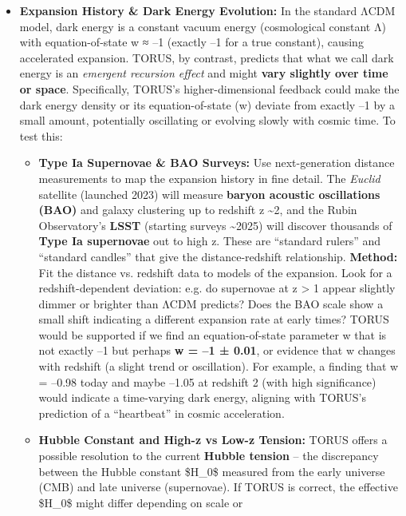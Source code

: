 \documentclass[]{article}
\begin{document}
\begin{itemize}
\item
  \textbf{Expansion History \& Dark Energy Evolution:} In the standard
  ΛCDM model, dark energy is a constant vacuum energy (cosmological
  constant Λ) with equation-of-state w ≈ --1 (exactly --1 for a true
  constant), causing accelerated expansion. TORUS, by contrast, predicts
  that what we call dark energy is an \emph{emergent recursion effect}
  and might \textbf{vary slightly over time or space}​. Specifically,
  TORUS's higher-dimensional feedback could make the dark energy density
  or its equation-of-state (w) deviate from exactly --1 by a small
  amount, potentially oscillating or evolving slowly with cosmic time​.
  To test this:

  \begin{itemize}
  \item
    \textbf{Type Ia Supernovae \& BAO Surveys:} Use next-generation
    distance measurements to map the expansion history in fine detail.
    The \emph{Euclid} satellite (launched 2023) will measure
    \textbf{baryon acoustic oscillations (BAO)} and galaxy clustering up
    to redshift z \textasciitilde{}2, and the Rubin Observatory's
    \textbf{LSST} (starting surveys \textasciitilde{}2025) will discover
    thousands of \textbf{Type Ia supernovae} out to high z. These are
    ``standard rulers'' and ``standard candles'' that give the
    distance-redshift relationship. \textbf{Method:} Fit the distance
    vs. redshift data to models of the expansion. Look for a
    redshift-dependent deviation: e.g. do supernovae at z \textgreater{}
    1 appear slightly dimmer or brighter than ΛCDM predicts? Does the
    BAO scale show a small shift indicating a different expansion rate
    at early times? TORUS would be supported if we find an
    equation-of-state parameter w that is not exactly --1 but perhaps
    \textbf{w = --1 ± 0.01}, or evidence that w changes with redshift (a
    slight trend or oscillation)​. For example, a finding that w =
    --0.98 today and maybe --1.05 at redshift 2 (with high significance)
    would indicate a time-varying dark energy, aligning with TORUS's
    prediction of a ``heartbeat'' in cosmic acceleration​.
  \item
    \textbf{Hubble Constant and High-z vs Low-z Tension:} TORUS offers a
    possible resolution to the current \textbf{Hubble tension} -- the
    discrepancy between the Hubble constant \$H\_0\$ measured from the
    early universe (CMB) and late universe (supernovae)​. If TORUS is
    correct, the effective \$H\_0\$ might differ depending on scale or

\end{itemize}
\end{itemize}
\end{document}
